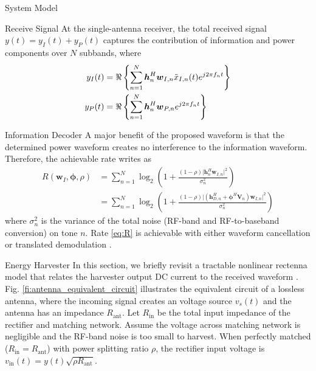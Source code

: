 \documentclass{IEEEtran}
\begin{document}
\begin{section}{System Model}
	\begin{subsection}{Receive Signal}
		At the single-antenna receiver, the total received signal $y(t)=y_I(t)+y_P(t)$ captures the contribution of information and power components over $N$ subbands, where
		\begin{align}\label{eq:y_{I/P}}
			y_{I}(t) & = \Re\left\{\sum_{n=1}^N{\boldsymbol{h}_{n}^H}{\boldsymbol{w}_{I,n}\tilde{x}_{I,n}(t)}{e^{j2{\pi}{f_n}{t}}}\right\}\\
			y_{P}(t) & = \Re\left\{\sum_{n=1}^N{\boldsymbol{h}_{n}^H}\boldsymbol{w}_{P,n}{e^{j2{\pi}{f_n}{t}}}\right\}
		\end{align}
	\end{subsection}

	\begin{subsection}{Information Decoder}
		A major benefit of the proposed waveform is that the determined power waveform creates no interference to the information waveform. Therefore, the achievable rate writes as
		\begin{equation}\label{eq:R}
			\begin{split}
				R(\boldsymbol{w}_I,\boldsymbol{\phi},\rho)
				& = \sum_{n=1}^N{\log_2\left(1+\frac{(1-\rho)\lvert \boldsymbol{h}_{n}^H\boldsymbol{w}_{I,n} \rvert^2}{\sigma_n^2}\right)}\\
				& = \sum_{n=1}^N{\log_2\left(1+\frac{(1-\rho)\lvert(\boldsymbol{h}_{D,n}^H+\boldsymbol{\phi}^H\boldsymbol{V}_n)\boldsymbol{w}_{I,n}\rvert^2}{\sigma_n^2}\right)}
			\end{split}
		\end{equation}
		where $\sigma_n^2$ is the variance of the total noise (RF-band and RF-to-baseband conversion) on tone $n$. Rate \ref{eq:R} is achievable with either waveform cancellation or translated demodulation \cite{Clerckx2018b}.
	\end{subsection}

	\begin{subsection}{Energy Harvester}
		In this section, we briefly revisit a tractable nonlinear rectenna model that relates the harvester output DC current to the received waveform \cite{Clerckx2016a,Clerckx2018b}. Fig. \ref{fi:antenna_equivalent_circuit} illustrates the equivalent circuit of a lossless antenna, where the incoming signal creates an voltage source $v_s(t)$ and the antenna has an impedance $R_{\text{ant}}$. Let $R_{\text{in}}$ be the total input impedance of the rectifier and matching network. Assume the voltage across matching network is negligible and the RF-band noise is too small to harvest. When perfectly matched ($R_{\text{in}}=R_{\text{ant}}$) with power splitting ratio $\rho$, the rectifier input voltage is $v_{\text{in}}(t)=y(t)\sqrt{\rho R_{\text{ant}}}$.


\end{subsection}
\end{section}
\end{document}

